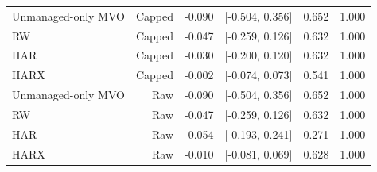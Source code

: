 \begin{table}[p]
\begin{tabular}{lrrrrr}
\hline
Unmanaged-only MVO & Capped & -0.090 & [-0.504, 0.356] & 0.652 & 1.000 \\
RW & Capped & -0.047 & [-0.259, 0.126] & 0.632 & 1.000 \\
HAR & Capped & -0.030 & [-0.200, 0.120] & 0.632 & 1.000 \\
HARX & Capped & -0.002 & [-0.074, 0.073] & 0.541 & 1.000 \\
Unmanaged-only MVO & Raw & -0.090 & [-0.504, 0.356] & 0.652 & 1.000 \\
RW & Raw & -0.047 & [-0.259, 0.126] & 0.632 & 1.000 \\
HAR & Raw & 0.054 & [-0.193, 0.241] & 0.271 & 1.000 \\
HARX & Raw & -0.010 & [-0.081, 0.069] & 0.628 & 1.000 \\
\hline
\end{tabular}
\end{table}
